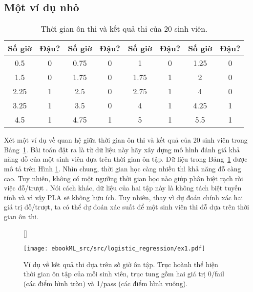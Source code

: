 \subsection{Một ví dụ nhỏ}
\begin{table}[]
\centering
\caption{Thời gian ôn thi và kết quả thi của 20 sinh viên. }
\label{tab:10_1}
\begin{tabular}{|c|c||c|c||c|c||c|c|}
\hline
\textbf{Số giờ} & \textbf{Đậu?} & \textbf{Số giờ} & \textbf{Đậu?} & \textbf{Số giờ} & \textbf{Đậu?} & \textbf{Số giờ} & \textbf{Đậu?} \\ \hline \hline
0.5            & 0             & 0.75           & 0             & 1              & 0             & 1.25           & 0             \\ \hline
1.5            & 0             & 1.75           & 0             & 1.75           & 1             & 2              & 0             \\ \hline
2.25           & 1             & 2.5            & 0             & 2.75           & 1             & 4              & 0             \\ \hline
3.25           & 1             & 3.5            & 0             & 4              & 1             & 4.25           & 1             \\ \hline
4.5            & 1             & 4.75           & 1             & 5              & 1             & 5.5            & 1             \\ \hline
\end{tabular}
\end{table}

Xét một ví dụ về quan hệ giữa thời gian ôn thi và kết quả của 20 sinh
viên trong Bảng~\ref{tab:10_1}. Bài toán đặt ra là từ dữ liệu này hãy
xây dựng mô hình đánh giá khả năng đỗ của một sinh viên dựa trên thời gian
ôn tập. Dữ liệu trong Bảng~\ref{tab:10_1} được mô tả trên Hình \ref{fig:10_1}.
Nhìn chung, thời gian học càng nhiều thì khả năng đỗ càng cao. Tuy nhiên, không
có một ngưỡng thời gian học nào giúp phân biệt rạch ròi việc đỗ/trượt . Nói cách
khác, dữ liệu của hai tập này là không tách biệt tuyến tính và vì vậy PLA sẽ
không hữu ích. Tuy nhiên, thay vì dự đoán chính xác hai giá trị đỗ/trượt,
ta có thể dự đoán xác suất để một sinh viên thi đỗ dựa trên thời gian ôn thi.

\begin{figure}[t]
[\FBwidth]
{\caption{
Ví dụ về kết quả thi dựa trên số giờ ôn tập. Trục hoành thể hiện thời gian ôn tập của mỗi sinh viên, trục tung gồm hai giá trị 0/fail (các điểm hình tròn) và 1/pass (các điểm hình vuông).
}
\label{fig:10_1}}
{ %
\texttt{[image: ebookML\_src/src/logistic\_regression/ex1.pdf]}
}
\end{figure}


